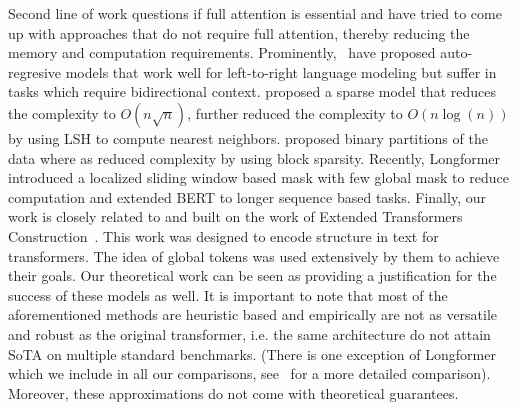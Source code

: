 Second line of work questions if full attention is essential and have tried to come up with approaches that do not require full attention, thereby reducing the memory and computation requirements.
Prominently,~\citet{dai2019transformer, sukhbaatar2019adaptive, rae2019compressive} have proposed auto-regresive models that work well for left-to-right language modeling but suffer in tasks which require bidirectional context.
\citet{child2019generating} proposed a sparse model that reduces the complexity to $O(n\sqrt{n})$, \citet{kitaev2019reformer} further reduced the complexity to $O(n\log(n))$ by using LSH to compute  nearest neighbors. 
\citet{ye2019bp} proposed binary partitions of the data where as \citet{qiu2019blockwise} reduced complexity by using block sparsity. 
Recently, Longformer \cite{beltagy2020longformer} introduced a localized sliding 
window based mask with few global mask to reduce computation and extended BERT to longer sequence based tasks. 
Finally, our work is closely related to and built on the work of Extended Transformers Construction~\citep{ainslie2020etc}. 
This work was designed to encode structure in text for transformers. The idea of global tokens was used extensively by them to achieve their goals. Our theoretical work can be seen as providing a  justification for the success of these models as well.
It is important to note that most of the aforementioned methods are heuristic based and empirically are not as versatile and robust as the original transformer, i.e. the same architecture do not attain SoTA on multiple standard benchmarks. (There is one exception of Longformer which we include in all our comparisons, see~ for a more detailed comparison). 
Moreover, these approximations do not come with theoretical guarantees. 

